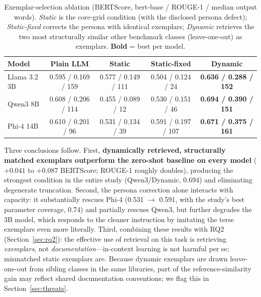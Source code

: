 \documentclass[pdflatex,sn-mathphys-ay]{sn-jnl}%
\theoremstyle{thmstyleone}%
\theoremstyle{thmstyletwo}%
\theoremstyle{thmstylethree}%
\begin{document}
{\begin{table}[h]
\centering
\small
\caption{Exemplar-selection ablation (BERTScore, bert-base / ROUGE-1 / median output words). \emph{Static} is the core-grid condition (with the disclosed persona defect); \emph{Static-fixed} corrects the persona with identical exemplars; \emph{Dynamic} retrieves the two most structurally similar other benchmark classes (leave-one-out) as exemplars. \textbf{Bold} = best per model.}
\label{tab:fewshot-ablation}
\begin{tabular}{lcccc}
\toprule
\textbf{Model} & \textbf{Plain LLM} & \textbf{Static} & \textbf{Static-fixed} & \textbf{Dynamic} \\
\midrule
Llama 3.2 3B & 0.595 / 0.169 / 159 & 0.577 / 0.149 / 111 & 0.504 / 0.124 / 24 & \textbf{0.636 / 0.288 / 152} \\
Qwen3 8B     & 0.608 / 0.206 / 114 & 0.455 / 0.089 / 12  & 0.530 / 0.151 / 46  & \textbf{0.694 / 0.390 / 151} \\
Phi-4 14B    & 0.610 / 0.201 / 96  & 0.531 / 0.134 / 39  & 0.591 / 0.197 / 107 & \textbf{0.671 / 0.375 / 161} \\
\bottomrule
\end{tabular}
\end{table}

Three conclusions follow. First, \textbf{dynamically retrieved, structurally matched exemplars outperform the zero-shot baseline on every model} ($+0.041$ to $+0.087$ BERTScore; ROUGE-1 roughly doubles), producing the strongest condition in the entire study (Qwen3/Dynamic, 0.694) and eliminating degenerate truncation. Second, the persona correction alone interacts with capacity: it substantially rescues Phi-4 (0.531 $\rightarrow$ 0.591, with the study's best parameter coverage, 0.74) and partially rescues Qwen3, but further degrades the 3B model, which responds to the cleaner instruction by imitating the terse exemplars even more literally. Third, combining these results with RQ2 (Section~\ref{sec:rq2}): the effective use of retrieval on this task is retrieving \emph{exemplars}, not \emph{documentation}---in-context learning is not harmful per se; mismatched static exemplars are. Because dynamic exemplars are drawn leave-one-out from sibling classes in the same libraries, part of the reference-similarity gain may reflect shared documentation conventions; we flag this in Section~\ref{sec:threats}.

}
\end{document}
